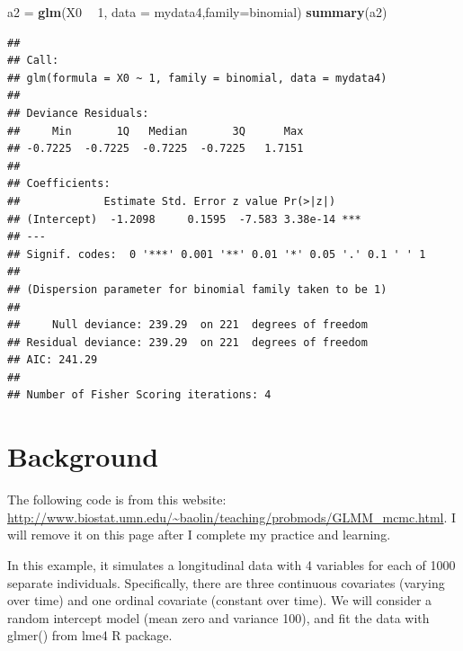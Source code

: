\documentclass[]{book}
\newenvironment{Shaded}{\begin{snugshade}}{\end{snugshade}}
\newcommand{\KeywordTok}[1]{\textcolor[rgb]{0.13,0.29,0.53}{\textbf{#1}}}
\newcommand{\DataTypeTok}[1]{\textcolor[rgb]{0.13,0.29,0.53}{#1}}
\newcommand{\DecValTok}[1]{\textcolor[rgb]{0.00,0.00,0.81}{#1}}
\newcommand{\StringTok}[1]{\textcolor[rgb]{0.31,0.60,0.02}{#1}}
\newcommand{\OperatorTok}[1]{\textcolor[rgb]{0.81,0.36,0.00}{\textbf{#1}}}
\newcommand{\NormalTok}[1]{#1}
\begin{document}
\begin{Shaded}
\begin{Highlighting}[]
\NormalTok{a2 =}\StringTok{ }\KeywordTok{glm}\NormalTok{(X0 }\OperatorTok{~}\StringTok{ }\DecValTok{1}\NormalTok{, }\DataTypeTok{data =}\NormalTok{ mydata4,}\DataTypeTok{family=}\NormalTok{binomial)}
\KeywordTok{summary}\NormalTok{(a2)}
\end{Highlighting}
\end{Shaded}

\begin{verbatim}
## 
## Call:
## glm(formula = X0 ~ 1, family = binomial, data = mydata4)
## 
## Deviance Residuals: 
##     Min       1Q   Median       3Q      Max  
## -0.7225  -0.7225  -0.7225  -0.7225   1.7151  
## 
## Coefficients:
##             Estimate Std. Error z value Pr(>|z|)    
## (Intercept)  -1.2098     0.1595  -7.583 3.38e-14 ***
## ---
## Signif. codes:  0 '***' 0.001 '**' 0.01 '*' 0.05 '.' 0.1 ' ' 1
## 
## (Dispersion parameter for binomial family taken to be 1)
## 
##     Null deviance: 239.29  on 221  degrees of freedom
## Residual deviance: 239.29  on 221  degrees of freedom
## AIC: 241.29
## 
## Number of Fisher Scoring iterations: 4
\end{verbatim}

\section{Background}\label{background}

The following code is from this website:
\url{http://www.biostat.umn.edu/~baolin/teaching/probmods/GLMM_mcmc.html}.
I will remove it on this page after I complete my practice and learning.

In this example, it simulates a longitudinal data with 4 variables for
each of 1000 separate individuals. Specifically, there are three
continuous covariates (varying over time) and one ordinal covariate
(constant over time). We will consider a random intercept model (mean
zero and variance 100), and fit the data with glmer() from lme4 R
package.
\end{document}
